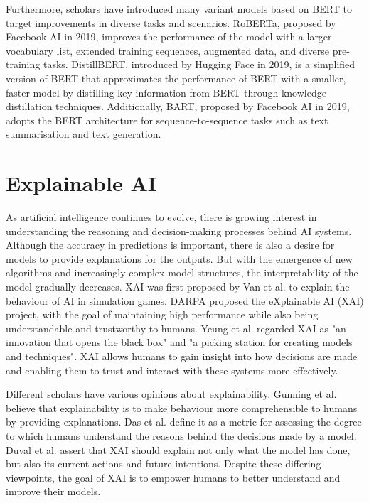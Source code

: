 \documentclass[ %
                    author={Louis Wang},
                supervisor={Dr. Qiang Liu},
                    degree={MSc},
                     title={Identification of Suicide Ideation in Texts},
                      type={},
                      year={2024}]{dissertation}
\begin{document}
Furthermore, scholars have introduced many variant models based on BERT to target improvements in diverse tasks and scenarios. RoBERTa, proposed by Facebook AI in 2019\cite{liu2019roberta}, improves the performance of the model with a larger vocabulary list, extended training sequences, augmented data, and diverse pre-training tasks. DistillBERT, introduced by Hugging Face in 2019\cite{sanh2020distilbert}, is a simplified version of BERT that approximates the performance of BERT with a smaller, faster model by distilling key information from BERT through knowledge distillation techniques. Additionally, BART, proposed by Facebook AI in 2019\cite{lewis2019bart}, adopts the BERT architecture for sequence-to-sequence tasks such as text summarisation and text generation.

\section{Explainable AI}
\noindent
As artificial intelligence continues to evolve, there is growing interest in understanding the reasoning and decision-making processes behind AI systems. Although the accuracy in predictions is important, there is also a desire for models to provide explanations for the outputs.\cite{doshi2017towards} But with the emergence of new algorithms and increasingly complex model structures, the interpretability of the model gradually decreases. XAI was first proposed by Van et al.\cite{van2004explainable} to explain the behaviour of AI in simulation games. DARPA proposed the eXplainable AI (XAI) project\cite{gunning2019darpa}, with the goal of maintaining high performance while also being understandable and trustworthy to humans. Yeung et al.\cite{2021Enhancing} regarded XAI as "an innovation that opens the black box" and "a picking station for creating models and techniques". XAI allows humans to gain insight into how decisions are made and enabling them to trust and interact with these systems more effectively.

Different scholars have various opinions about explainability. Gunning et al.\cite{gunning2019xai} believe that explainability is to make behaviour more comprehensible to humans by providing explanations. Das et al.\cite{das2020taxonomy} define it as a metric for assessing the degree to which humans understand the reasons behind the decisions made by a model. Duval et al.\cite{duval2019explainable} assert that XAI should explain not only what the model has done, but also its current actions and future intentions. Despite these differing viewpoints, the goal of XAI is to empower humans to better understand and improve their models.
\end{document}
